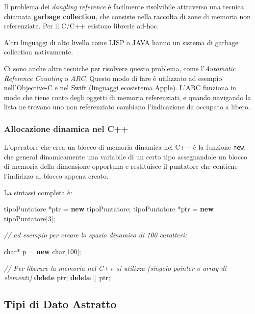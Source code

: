 \documentclass[
]{article}
\newenvironment{Shaded}{}{}
\newcommand{\CommentTok}[1]{\textcolor[rgb]{0.38,0.63,0.69}{\textit{#1}}}
\newcommand{\DataTypeTok}[1]{\textcolor[rgb]{0.56,0.13,0.00}{#1}}
\newcommand{\DecValTok}[1]{\textcolor[rgb]{0.25,0.63,0.44}{#1}}
\newcommand{\KeywordTok}[1]{\textcolor[rgb]{0.00,0.44,0.13}{\textbf{#1}}}
\newcommand{\NormalTok}[1]{#1}
\begin{document}
Il problema dei \emph{dangling reference} è facilmente risolvibile
attraverso una tecnica chiamata \textbf{garbage collection}, che
consiste nella raccolta di zone di memoria non referenziate. Per il
C/C++ esistono librerie ad-hoc.

Altri linguaggi di alto livello come LISP o JAVA hanno un sistema di
garbage collection nativamente.

Ci sono anche altre tecniche per risolvere questo problema, come
l'\emph{Automatic Reference Counting} o \emph{ARC}. Questo modo di fare
è utilizzato ad esempio nell'Objective-C e nel Swift (linguaggi
ecosistema Apple). L'ARC funziona in modo che tiene conto degli oggetti
di memoria referenziati, e quando navigando la lista ne trovano uno non
referenziato cambiano l'indicazione da occupato a libero.

\hypertarget{header-n1144}{%
\subsubsection{Allocazione dinamica nel C++}\label{header-n1144}}

L'operatore che crea un blocco di memoria dinamica nel C++ è la funzione
\texttt{new}, che general dinamicamente una variabile di un certo tipo
assegnandole un blocco di memoria della dimensione opportuna e
restituisce il puntatore che contiene l'indirizzo al blocco appena
creato.

La sintassi completa è:

\begin{Shaded}
\begin{Highlighting}[]
\NormalTok{tipoPuntatore *ptr = }\KeywordTok{new}\NormalTok{ tipoPuntatore;}
\NormalTok{tipoPuntatore *ptr = }\KeywordTok{new}\NormalTok{ tipoPuntatore[}\DecValTok{3}\NormalTok{];}

\CommentTok{// ad esempio per creare lo spazio dinamico di 100 caratteri:}

\DataTypeTok{char}\NormalTok{* p = }\KeywordTok{new} \DataTypeTok{char}\NormalTok{[}\DecValTok{100}\NormalTok{];}

\CommentTok{// Per liberare la memoria nel C++ si utilizza (singolo pointer o array di elementi)}
\KeywordTok{delete}\NormalTok{ ptr;}
\KeywordTok{delete}\NormalTok{ [] ptr; }
\end{Highlighting}
\end{Shaded}

\hypertarget{header-n1149}{%
\subsection{Tipi di Dato Astratto}\label{header-n1149}}
\end{document}
